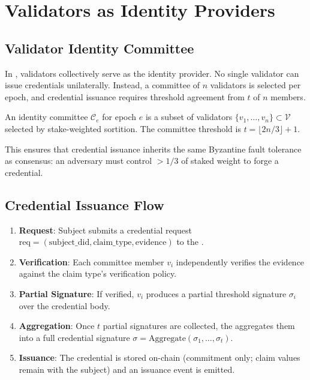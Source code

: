 \section{Validators as Identity Providers}


\subsection{Validator Identity Committee}

In \IChain{}, validators collectively serve as the identity provider. No single validator can issue credentials unilaterally. Instead, a committee of $n$ validators is selected per epoch, and credential issuance requires threshold agreement from $t$ of $n$ members.

\begin{definition}
An identity committee $\mathcal{C}_e$ for epoch $e$ is a subset of validators $\{v_1, \ldots, v_n\} \subset \mathcal{V}$ selected by stake-weighted sortition. The committee threshold is $t = \lfloor 2n/3 \rfloor + 1$.
\end{definition}

This ensures that credential issuance inherits the same Byzantine fault tolerance as consensus: an adversary must control $> 1/3$ of staked weight to forge a credential.

\subsection{Credential Issuance Flow}

\begin{enumerate}
\item \textbf{Request}: Subject submits a credential request $\text{req} = (\text{subject\_did}, \text{claim\_type}, \text{evidence})$ to the \IdentityVM{}.
\item \textbf{Verification}: Each committee member $v_i$ independently verifies the evidence against the claim type's verification policy.
\item \textbf{Partial Signature}: If verified, $v_i$ produces a partial threshold signature $\sigma_i$ over the credential body.
\item \textbf{Aggregation}: Once $t$ partial signatures are collected, the \IdentityVM{} aggregates them into a full credential signature $\sigma = \text{Aggregate}(\sigma_1, \ldots, \sigma_t)$.
\item \textbf{Issuance}: The credential is stored on-chain (commitment only; claim values remain with the subject) and an issuance event is emitted.
\end{enumerate}

